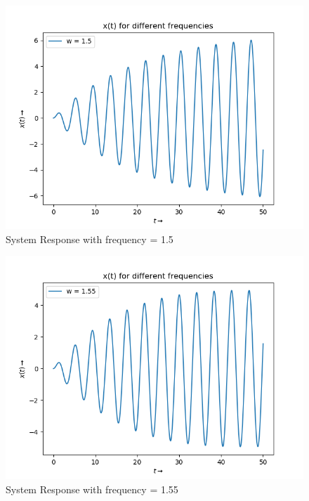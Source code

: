 \documentclass{article}
\begin{document}
\begin{figure}[h!]
\centering
\includegraphics[scale=0.7]{fig5_6.png}
\caption{System Response with frequency = 1.5}
\label{fig:System Response with frequency = 1.5}
\end{figure}

\begin{figure}[h!]
\centering
\includegraphics[scale=0.7]{fig6_6.png}
\caption{System Response with frequency = 1.55}
\label{fig:System Response with frequency = 1.55}
\end{figure}
\end{document}
